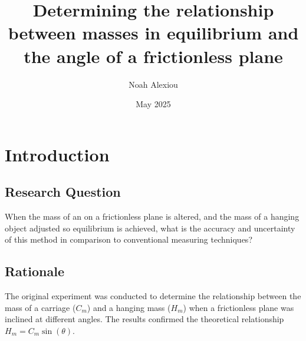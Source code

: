\documentclass[11pt,a4paper]{article}
\begin{document}
\nocite{*}
\begin{titlepage}


\title{Determining the relationship between masses in equilibrium and the angle of a frictionless plane}

\author{Noah Alexiou}


\date{May 2025}

\maketitle
\centering

\end{titlepage}
\tableofcontents
\newpage

\section{Introduction}

\subsection{Research Question}
When the mass of an  on a frictionless plane is altered, and the mass of a hanging object adjusted so equilibrium is achieved, what is the accuracy and uncertainty of this method in comparison to conventional measuring techniques? 

\subsection{Rationale}

The original experiment was conducted to determine the relationship between the mass of a carriage ($C_m$) and a hanging mass ($H_m$) when a frictionless plane was inclined at different angles. The results confirmed the theoretical relationship $H_m = C_m \sin(\theta)$.
\end{document}
